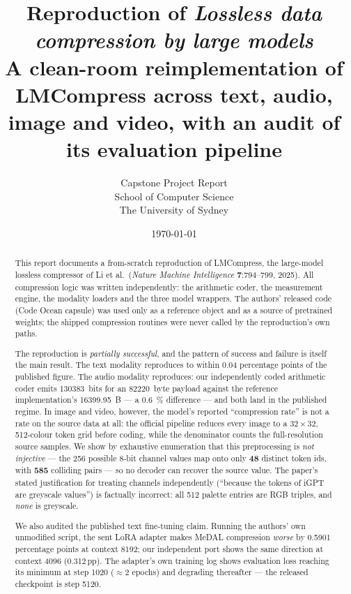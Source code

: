 \documentclass[11pt,a4paper]{article}
\title{\vspace{-1.5cm}\textbf{Reproduction of \emph{Lossless data compression by
large models}}\\[0.4em]
\large A clean-room reimplementation of LMCompress across text, audio, image and
video, with an audit of its evaluation pipeline}
\author{Capstone Project Report\\School of Computer Science\\The University of Sydney}
\date{\today}
\begin{document}
\maketitle
\thispagestyle{empty}

\begin{abstract}
\noindent
This report documents a from-scratch reproduction of LMCompress, the
large-model lossless compressor of Li et al.\ (\emph{Nature Machine
Intelligence} \textbf{7}:794--799, 2025). All compression logic was written
independently: the arithmetic coder, the measurement engine, the modality
loaders and the three model wrappers. The authors' released code (Code Ocean
capsule) was used only as a reference object and as a source of pretrained
weights; the shipped compression routines were never called by the
reproduction's own paths.

The reproduction is \emph{partially successful}, and the pattern of success and
failure is itself the main result. The text modality reproduces to within
\num{0.04} percentage points of the published figure. The audio modality
reproduces: our independently coded arithmetic coder emits \SI{130383}{bits} for
an \SI{82220}{byte} payload against the reference implementation's
\SI{16399.95}{B} --- a \SI{0.6}{\%} difference --- and both land in the
published regime. In image and video, however, the model's reported
``compression rate'' is not a rate on the source data at all: the official
pipeline reduces every image to a $32\times32$, 512-colour token grid before
coding, while the denominator counts the full-resolution source samples. We show
by exhaustive enumeration that this preprocessing is \emph{not injective} ---
the 256 possible 8-bit channel values map onto only \textbf{48} distinct token
ids, with \textbf{585} colliding pairs --- so no decoder can recover the source
value. The paper's stated justification for treating channels independently
(``because the tokens of iGPT are greyscale values'') is factually incorrect: all
512 palette entries are RGB triples, and \emph{none} is greyscale.

We also audited the published text fine-tuning claim. Running the authors' own
unmodified script, the sent LoRA adapter makes MeDAL compression \emph{worse} by
\num{0.5901} percentage points at context \num{8192}; our independent port shows
the same direction at context \num{4096} (\num{+0.312}\,pp). The adapter's own
training log shows evaluation loss reaching its minimum at step \num{1020}
($\approx 2$ epochs) and degrading thereafter --- the released checkpoint is
step \num{5120}.


\end{abstract}
\end{document}
